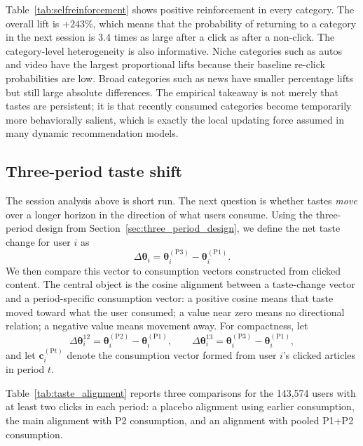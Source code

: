 \documentclass[11pt]{article}
\begin{document}
Table~\ref{tab:selfreinforcement} shows positive reinforcement in every category. The overall lift is $+243\%$, which means that the probability of returning to a category in the next session is 3.4 times as large after a click as after a non-click. The category-level heterogeneity is also informative. Niche categories such as autos and video have the largest proportional lifts because their baseline re-click probabilities are low. Broad categories such as news have smaller percentage lifts but still large absolute differences. The empirical takeaway is not merely that tastes are persistent; it is that recently consumed categories become temporarily more behaviorally salient, which is exactly the local updating force assumed in many dynamic recommendation models.

\subsection{Three-period taste shift}
\label{sec:three_period}

The session analysis above is short run. The next question is whether tastes \emph{move} over a longer horizon in the direction of what users consume. Using the three-period design from Section~\ref{sec:three_period_design}, we define the net taste change for user $i$ as
\[
\Delta\boldsymbol{\theta}_i = \boldsymbol{\theta}_i^{(\mathrm{P3})} - \boldsymbol{\theta}_i^{(\mathrm{P1})}.
\]
We then compare this vector to consumption vectors constructed from clicked content. The central object is the cosine alignment between a taste-change vector and a period-specific consumption vector: a positive cosine means that taste moved toward what the user consumed; a value near zero means no directional relation; a negative value means movement away. For compactness, let
\[
\Delta\boldsymbol{\theta}_i^{12}=\boldsymbol{\theta}_i^{(\mathrm{P2})}-\boldsymbol{\theta}_i^{(\mathrm{P1})},
\qquad
\Delta\boldsymbol{\theta}_i^{13}=\boldsymbol{\theta}_i^{(\mathrm{P3})}-\boldsymbol{\theta}_i^{(\mathrm{P1})},
\]
and let $\mathbf{c}_i^{(\mathrm{P}t)}$ denote the consumption vector formed from user $i$'s clicked articles in period $t$.

Table~\ref{tab:taste_alignment} reports three comparisons for the 143,574 users with at least two clicks in each period: a placebo alignment using earlier consumption, the main alignment with P2 consumption, and an alignment with pooled P1+P2 consumption.
\end{document}
